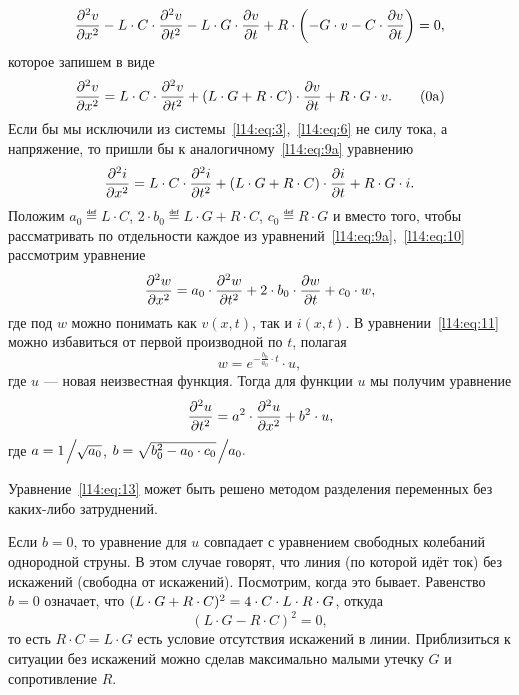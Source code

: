 \begin{equation*}
	 \frac{\partial^2v}{\partial x^2}-L\cdot C\cdot\frac{\partial^2v}{\partial t^2}-L\cdot G\cdot \frac{\partial v}{\partial t}+R\cdot \left(-G\cdot v-C\cdot\frac{\partial v}{\partial t}\right)=0,
\end{equation*}  
которое запишем в виде
\begin{equation}\label{l14:eq:9a}
	 \pdder{v}{x}=L\cdot C\cdot\pdder{v}{t}+(L\cdot G+R\cdot C)\cdot\pder{v}{t}+R\cdot G\cdot v.\tag{\theequation a}
\end{equation} 
Если бы мы исключили из системы~\eqref{l14:eq:3},~\eqref{l14:eq:6} не силу тока, а напряжение, то пришли бы к аналогичному~\eqref{l14:eq:9a} уравнению
\begin{equation}\label{l14:eq:10}
	 \frac{\partial^2i}{\partial x^2}=L\cdot C\cdot\frac{\partial^2i}{\partial t^2}+(L\cdot G +R\cdot C)\cdot\frac{\partial i}{\partial t}+R\cdot G\cdot i.
\end{equation} 
Положим $a_0\eqdef L\cdot C$, $2\cdot b_0\eqdef L\cdot G +R\cdot C$, $c_0\eqdef R\cdot G$ и вместо того, чтобы рассматривать по отдельности каждое из уравнений~\eqref{l14:eq:9a},~\eqref{l14:eq:10} рассмотрим уравнение 
\begin{equation}\label{l14:eq:11}
	 \frac{\partial^2w}{\partial x^2}=a_0\cdot\frac{\partial^2w}{\partial t^2}+2\cdot b_0\cdot\frac{\partial w}{\partial t}+c_0\cdot w,
\end{equation} 
где под $w$ можно понимать как $v(x,t)$, так и $i(x,t)$. В уравнении~\eqref{l14:eq:11} можно избавиться от первой производной по $t$, полагая 
\begin{equation}\label{l14:eq:12}
	 w=e^{-\frac{b_0}{a_0}\cdot t}\cdot u, 
\end{equation}
где $u$ --- новая неизвестная функция. Тогда для функции $u$ мы получим уравнение
\begin{equation}\label{l14:eq:13}
	 \frac{\partial^2u}{\partial t^2}=a^2\cdot\frac{\partial^2u}{\partial x^2}+b^2\cdot u,
\end{equation} 
где $a=1\!\Bigm/\!\!\sqrt{a_0}$, $b=\sqrt{b_0^2-a_0\cdot c_0}\!\Bigm/\!\!a_0.$

Уравнение~\eqref{l14:eq:13} может быть решено методом разделения переменных без каких-либо затруднений.

Если $b=0$, то уравнение для $u$ совпадает с уравнением свободных колебаний однородной струны. В этом случае говорят, что линия (по которой идёт ток) без искажений (свободна от искажений). Посмотрим, когда это бывает. Равенство $b=0$ означает, что $(L\cdot G+R\cdot C)^2\?=4\cdot C\cdot L\cdot R\cdot G$, откуда 
\begin{equation*}
	(L\cdot G-R\cdot C)^2=0,
\end{equation*}
то есть $R\cdot C=L\cdot G$ есть условие отсутствия искажений в линии. Приблизиться к ситуации без искажений можно сделав максимально малыми утечку $G$ и сопротивление $R$.
